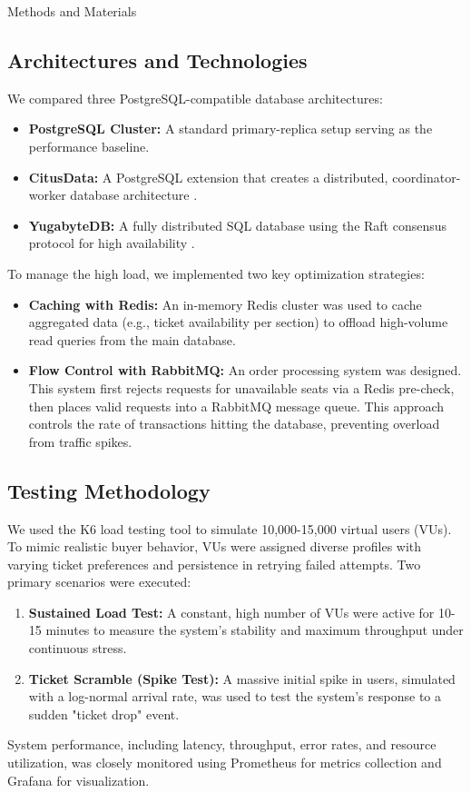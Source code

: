 \documentclass[a0,landscape]{config/poster/a0poster}
\newcommand{\postersection}[1]{%
  \begin{tcolorbox}[
    colback=IEEEblue,
    colframe=IEEEblue,
    fonttitle=\bfseries,
    coltext=white,
    sharp corners,
    boxrule=0pt,
    top=4pt,
    bottom=4pt,
    halign=center
  ]
    \large #1
  \end{tcolorbox}%
}
\begin{document}
\begin{multicols}{4}
    \postersection{Methods and Materials}
    \subsection*{Architectures and Technologies}
    We compared three PostgreSQL-compatible database architectures:
    \begin{itemize}
        \item \textbf{PostgreSQL Cluster:} A standard primary-replica setup serving as the performance baseline.
        \item \textbf{CitusData:} A PostgreSQL extension that creates a distributed, coordinator-worker database architecture \cite{citus}.
        \item \textbf{YugabyteDB:} A fully distributed SQL database using the Raft consensus protocol for high availability \cite{yugabyte}.
    \end{itemize}

    To manage the high load, we implemented two key optimization strategies:
    \begin{itemize}
        \item \textbf{Caching with Redis:} An in-memory Redis cluster was used to cache aggregated data (e.g., ticket availability per section) to offload high-volume read queries from the main database.
        \item \textbf{Flow Control with RabbitMQ:} An order processing system was designed. This system first rejects requests for unavailable seats via a Redis pre-check, then places valid requests into a RabbitMQ message queue. This approach controls the rate of transactions hitting the database, preventing overload from traffic spikes.
    \end{itemize}

    \subsection*{Testing Methodology}
    We used the K6 load testing tool to simulate 10,000-15,000 virtual users (VUs). To mimic realistic buyer behavior, VUs were assigned diverse profiles with varying ticket preferences and persistence in retrying failed attempts. Two primary scenarios were executed:
    \begin{enumerate}
        \item \textbf{Sustained Load Test:} A constant, high number of VUs were active for 10-15 minutes to measure the system's stability and maximum throughput under continuous stress.
        \item \textbf{Ticket Scramble (Spike Test):} A massive initial spike in users, simulated with a log-normal arrival rate, was used to test the system's response to a sudden "ticket drop" event.
    \end{enumerate}
    System performance, including latency, throughput, error rates, and resource utilization, was closely monitored using Prometheus for metrics collection and Grafana for visualization.


\end{multicols}
\end{document}
